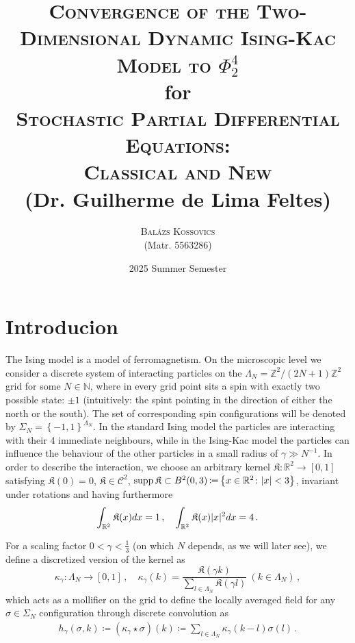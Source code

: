 \documentclass{report}
\title{\textsc{Convergence of the Two-Dimensional Dynamic Ising-Kac Model to $\Phi^4_2$}
\\[1.5em]
{\small {for}}\\[1.5em]
{\Large \textsc{Stochastic Partial Differential Equations: \\Classical and New}}\\
{\large (Dr. Guilherme de Lima Feltes)}}
\author{
    \textsc{Balázs Kossovics}\\
    {\small (Matr. 5563286)}
}
\date{2025 Summer Semester}
\newcommand{\ZZ}{\mathbb{Z}}
\newcommand{\NN}{\mathbb{N}}
\newcommand{\RR}{\mathbb{R}}
\DeclarePairedDelimiter\abs{\lvert}{\rvert} %
\newcommand{\Convolve}[2]{#1 \star #2}
\DeclareMathOperator{\DefiningEquality}{\coloneqq}
\DeclareMathOperator{\Support}{supp}
\theoremstyle{remark}
\theoremstyle{definition}
\begin{document}
\maketitle

\newpage
\setcounter{page}{2}

\tableofcontents

\chapter{Introducion}
The Ising model is a model of ferromagnetism. On the microscopic level we consider a discrete system of interacting particles on the $\Lambda_N = \ZZ^2 / (2N+1)\ZZ^2$ grid for some $N \in \NN$, where in every grid point sits a spin with exactly two possible state: $\pm1$ (intuitively:  the spint pointing in the direction of either the north or the south). The set of corresponding spin configurations will be denoted by $\Sigma_N = \left\{-1, 1\right\}^{\Lambda_N}$. In the standard Ising model the particles are interacting with their 4 immediate neighbours, while in the Ising-Kac model the particles can influence the behaviour of the other particles in a small radius of $\gamma \gg N^{-1}$. In order to describe the interaction, we choose an arbitrary kernel $\mathfrak{K}: \RR^2 \to [0, 1]$ satisfying $\mathfrak{K}(0) = 0$, $\mathfrak{K} \in \mathcal{C}^2$, $\Support{\mathfrak{K}} \subset B^2(0, 3) \DefiningEquality \left\{x \in \RR^2 \colon \abs{x} < 3\right\}$, invariant under rotations and having furthermore $$\int_{\RR^2} \mathfrak{K}(x) dx = 1\,,\quad \int_{\RR^2} \mathfrak{K}(x) \abs{x}^2 dx = 4\,.$$


For a scaling factor $0 < \gamma < \frac{1}{3}$ (on which $N$ depends, as we will later see), we define a discretized version  of the kernel as 
$$\kappa_\gamma: \Lambda_N \to [0, 1]\,,\quad\kappa_\gamma(k) = \frac{\mathfrak{K}(\gamma k)}{\sum_{l \in \Lambda_N} \mathfrak{K}(\gamma l)}~(k \in \Lambda_N)\,,$$
which acts as a mollifier on the grid to define the locally averaged field for any $\sigma \in \Sigma_N$ configuration through discrete convolution as \begin{align}
  h_\gamma(\sigma, k) \DefiningEquality (\Convolve{\kappa_\gamma}{\sigma})(k) \DefiningEquality  \sum_{l\in \Lambda_N} \kappa_\gamma(k-l) \sigma(l)\,.
\end{align}
\end{document}
